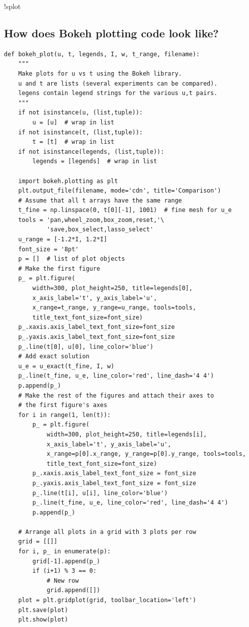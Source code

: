 \documentclass{beamer}
\begin{document}
\begin{frame}
!splot
\subsection{How does Bokeh plotting code look like?}

\begin{verbatim}
def bokeh_plot(u, t, legends, I, w, t_range, filename):
    """
    Make plots for u vs t using the Bokeh library.
    u and t are lists (several experiments can be compared).
    legens contain legend strings for the various u,t pairs.
    """
    if not isinstance(u, (list,tuple)):
        u = [u]  # wrap in list
    if not isinstance(t, (list,tuple)):
        t = [t]  # wrap in list
    if not isinstance(legends, (list,tuple)):
        legends = [legends]  # wrap in list

    import bokeh.plotting as plt
    plt.output_file(filename, mode='cdn', title='Comparison')
    # Assume that all t arrays have the same range
    t_fine = np.linspace(0, t[0][-1], 1001)  # fine mesh for u_e
    tools = 'pan,wheel_zoom,box_zoom,reset,'\ 
            'save,box_select,lasso_select'
    u_range = [-1.2*I, 1.2*I]
    font_size = '8pt'
    p = []  # list of plot objects
    # Make the first figure
    p_ = plt.figure(
        width=300, plot_height=250, title=legends[0],
        x_axis_label='t', y_axis_label='u',
        x_range=t_range, y_range=u_range, tools=tools,
        title_text_font_size=font_size)
    p_.xaxis.axis_label_text_font_size=font_size
    p_.yaxis.axis_label_text_font_size=font_size
    p_.line(t[0], u[0], line_color='blue')
    # Add exact solution
    u_e = u_exact(t_fine, I, w)
    p_.line(t_fine, u_e, line_color='red', line_dash='4 4')
    p.append(p_)
    # Make the rest of the figures and attach their axes to
    # the first figure's axes
    for i in range(1, len(t)):
        p_ = plt.figure(
            width=300, plot_height=250, title=legends[i],
            x_axis_label='t', y_axis_label='u',
            x_range=p[0].x_range, y_range=p[0].y_range, tools=tools,
            title_text_font_size=font_size)
        p_.xaxis.axis_label_text_font_size = font_size
        p_.yaxis.axis_label_text_font_size = font_size
        p_.line(t[i], u[i], line_color='blue')
        p_.line(t_fine, u_e, line_color='red', line_dash='4 4')
        p.append(p_)

    # Arrange all plots in a grid with 3 plots per row
    grid = [[]]
    for i, p_ in enumerate(p):
        grid[-1].append(p_)
        if (i+1) % 3 == 0:
            # New row
            grid.append([])
    plot = plt.gridplot(grid, toolbar_location='left')
    plt.save(plot)
    plt.show(plot)
\end{verbatim}
\end{frame}
\end{document}

